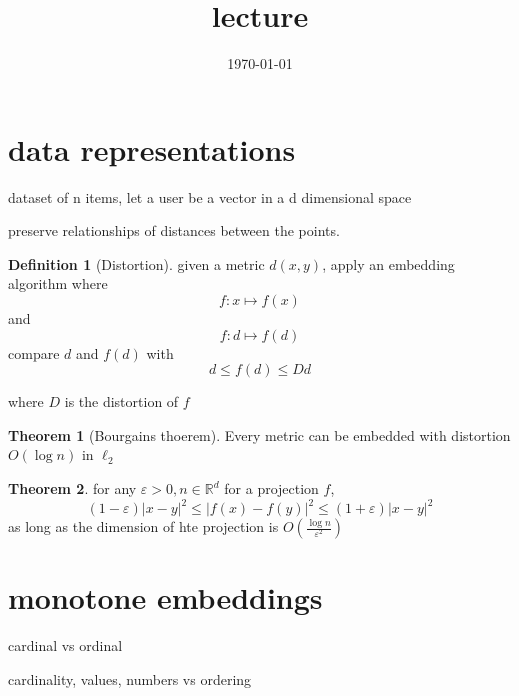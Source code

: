 \documentclass{article}
\title{lecture}
\date{\today}
\theoremstyle{definition}
\newtheorem{definition}{Definition}
\newtheorem{theorem}{Theorem}
\begin{document}
\maketitle

\section{data representations}

dataset of n items, let a user be a vector in a d dimensional space

preserve relationships of distances between the points. 

\begin{definition}[Distortion]
    given a metric \(d(x,y)\), apply an embedding algorithm where \begin{equation}
        f:x\mapsto f(x)
    \end{equation}
    and \begin{equation}
        f:d\mapsto f(d)
    \end{equation}
    compare \(d\) and \(f(d)\) with \begin{equation}
        d\leq f(d)\leq Dd
    \end{equation}

    where \(D\) is the distortion of \(f\)

\end{definition}

\begin{theorem}[Bourgains thoerem]
    Every metric can be embedded with distortion \(O(\log n)\) in \(\ell_2\)
\end{theorem}

\begin{theorem}
    for any \(\varepsilon>0, n\in \mathbb R^d\) for a projection \(f\), \begin{equation}
        (1-\varepsilon)\lvert x-y\rvert^2 \leq \lvert f(x)-f(y)\rvert^2\leq (1+\varepsilon)\lvert x-y\rvert^2
    \end{equation}
    as long as the dimension of hte projection is \(O(\frac{\log n}{\varepsilon^2})\)
\end{theorem}


\section{monotone embeddings}

cardinal vs ordinal

cardinality, values, numbers vs ordering
\end{document}
